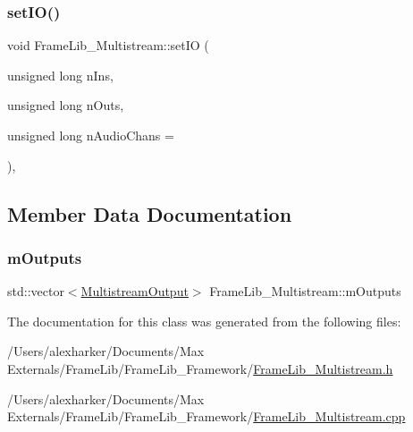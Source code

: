 \mbox{\label{class_frame_lib___multistream_a3de7fa55fbe51575695527d057d5ea90}} 
\subsubsection{\texorpdfstring{set\+I\+O()}{setIO()}}
{\footnotesize\ttfamily void Frame\+Lib\+\_\+\+Multistream\+::set\+IO (\begin{DoxyParamCaption}\item[{unsigned long}]{n\+Ins,  }\item[{unsigned long}]{n\+Outs,  }\item[{unsigned long}]{n\+Audio\+Chans = {} }\end{DoxyParamCaption})\hspace{0.3cm}{\ttfamily [inline]}, {\ttfamily [protected]}}



\subsection{Member Data Documentation}
\mbox{\label{class_frame_lib___multistream_a996d5595c6208b3067e720dc83454706}} 
\subsubsection{\texorpdfstring{m\+Outputs}{mOutputs}}
{\footnotesize\ttfamily std\+::vector$<$\hyperlink{class_frame_lib___multistream_a8844d112881e04687989f697a9337b11}{Multistream\+Output}$>$ Frame\+Lib\+\_\+\+Multistream\+::m\+Outputs\hspace{0.3cm}{\ttfamily [protected]}}



The documentation for this class was generated from the following files\+:\begin{DoxyCompactItemize}
\item 
/\+Users/alexharker/\+Documents/\+Max Externals/\+Frame\+Lib/\+Frame\+Lib\+\_\+\+Framework/\hyperlink{_frame_lib___multistream_8h}{Frame\+Lib\+\_\+\+Multistream.\+h}\item 
/\+Users/alexharker/\+Documents/\+Max Externals/\+Frame\+Lib/\+Frame\+Lib\+\_\+\+Framework/\hyperlink{_frame_lib___multistream_8cpp}{Frame\+Lib\+\_\+\+Multistream.\+cpp}\end{DoxyCompactItemize}
